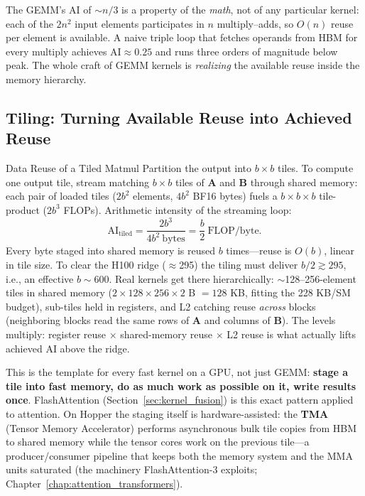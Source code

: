 The GEMM's AI of $\sim n/3$ is a property of the \textit{math}, not of any particular kernel: each of the $2n^2$ input elements participates in $n$ multiply--adds, so $O(n)$ reuse per element is available. A naive triple loop that fetches operands from HBM for every multiply achieves $\text{AI} \approx 0.25$ and runs three orders of magnitude below peak. The whole craft of GEMM kernels is \textit{realizing} the available reuse inside the memory hierarchy.

\subsection{Tiling: Turning Available Reuse into Achieved Reuse}

\begin{mathresult}{Data Reuse of a Tiled Matmul}
Partition the output into $b \times b$ tiles. To compute one output tile, stream matching $b \times b$ tiles of $\mathbf{A}$ and $\mathbf{B}$ through shared memory: each pair of loaded tiles ($2b^2$ elements, $4b^2$ BF16 bytes) fuels a $b \times b \times b$ tile-product ($2b^3$ FLOPs). Arithmetic intensity of the streaming loop:
\begin{equation}
\text{AI}_{\text{tiled}} = \frac{2b^3}{4b^2\ \text{bytes}} = \frac{b}{2}\ \text{FLOP/byte}.
\end{equation}
Every byte staged into shared memory is reused $b$ times---reuse is $O(b)$, linear in tile size. To clear the H100 ridge ($\approx$295) the tiling must deliver $b/2 \gtrsim 295$, i.e., an effective $b \sim 600$. Real kernels get there hierarchically: $\sim$128--256-element tiles in shared memory ($2 \times 128 \times 256 \times 2$ B $= 128$ KB, fitting the 228 KB/SM budget), sub-tiles held in registers, and L2 catching reuse \textit{across} blocks (neighboring blocks read the same rows of $\mathbf{A}$ and columns of $\mathbf{B}$). The levels multiply: register reuse $\times$ shared-memory reuse $\times$ L2 reuse is what actually lifts achieved AI above the ridge.
\end{mathresult}

This is the template for every fast kernel on a GPU, not just GEMM: \textbf{stage a tile into fast memory, do as much work as possible on it, write results once}. FlashAttention (Section~\ref{sec:kernel_fusion}) is this exact pattern applied to attention. On Hopper the staging itself is hardware-assisted: the \textbf{TMA} (Tensor Memory Accelerator) performs asynchronous bulk tile copies from HBM to shared memory while the tensor cores work on the previous tile---a producer/consumer pipeline that keeps both the memory system and the MMA units saturated (the machinery FlashAttention-3 exploits; Chapter~\ref{chap:attention_transformers}).

